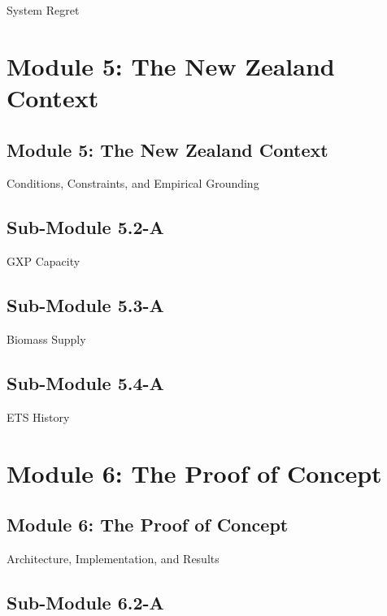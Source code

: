 \documentclass[
  11pt,
  a4paper,
  twoside,
  openright]{scrbook}
\begin{document}
System Regret

\hfill\break

\part{Module 5: The New Zealand Context}

\chapter{Module 5: The New Zealand
Context}\label{module-5-the-new-zealand-context-1}

Conditions, Constraints, and Empirical Grounding

\hfill\break

\chapter{Sub-Module 5.2-A}\label{sub-module-5.2-a}

GXP Capacity

\hfill\break

\chapter{Sub-Module 5.3-A}\label{sub-module-5.3-a}

Biomass Supply

\hfill\break

\chapter{Sub-Module 5.4-A}\label{sub-module-5.4-a}

ETS History

\hfill\break

\part{Module 6: The Proof of Concept}

\chapter{Module 6: The Proof of
Concept}\label{module-6-the-proof-of-concept-1}

Architecture, Implementation, and Results

\hfill\break

\chapter{Sub-Module 6.2-A}\label{sub-module-6.2-a}
\end{document}
